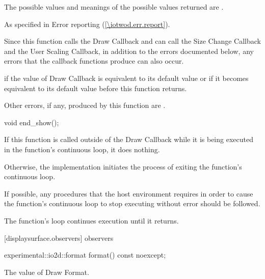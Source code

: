 \begin{itemdescr}
\pnum
\returns
The possible values and meanings of the possible values returned are .

\pnum
\throws
As specified in Error reporting (\ref{\iotwod.err.report}).

\pnum
\remarks
Since this function calls the Draw Callback and can call the Size Change Callback and the User Scaling Callback, in addition to the errors documented below, any errors that the callback functions produce can also occur.

\pnum
\errors
\pnum
{} if the value of Draw Callback is equivalent to its default value or if it becomes equivalent to its default value before this function returns.

\pnum
Other errors, if any, produced by this function are .
\end{itemdescr}

\begin{itemdecl}
void end_show();
\end{itemdecl}
\begin{itemdescr}
\pnum
\effects
If this function is called outside of the Draw Callback while it is being executed in the  function's continuous loop, it does nothing.

\pnum
Otherwise, the implementation initiates the process of exiting the  function's continuous loop.

\pnum
If possible, any procedures that the host environment requires in order to cause the  function's continuous loop to stop executing without error should be followed.

\pnum
The  function's loop continues execution until it returns.
\end{itemdescr}

 [displaysurface.observers]{ observers}

\begin{itemdecl}
experimental::io2d::format format() const noexcept;
\end{itemdecl}
\begin{itemdescr}
\pnum
\returns
The value of Draw Format.
\end{itemdescr}

